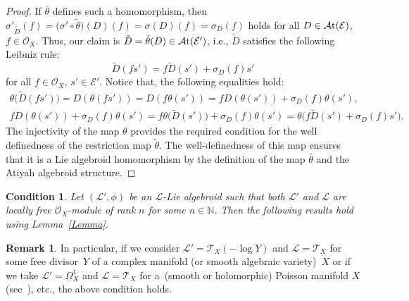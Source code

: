 \documentclass[pdftex]{sigma}
\numberwithin{equation}{section}
\newtheorem{Con}[Thm]{Condition}
\theoremstyle{definition}
\newtheorem{Rem}[Thm]{Remark}
\begin{document}
\begin{proof}
If $\bar{\theta}$ defines such a homomorphism, then $\sigma'_{\tilde{D}}(f)= \bigl(\sigma' \circ \tilde{\theta}\bigr) (D) (f)=\sigma (D)(f)=\sigma_D(f)$ holds for all $D \in \mathcal{A}{\rm t}(\mathcal{E})$, $f \in \mathcal{O}_X$. Thus, our claim is $\tilde{D}=\tilde{\theta}(D) \in \mathcal{A}{\rm t}(\mathcal{E}')$, i.e., $\tilde{D}$ satisfies the following Leibniz rule:
\[
\tilde{D}(f s')= f \tilde{D}(s')+ \sigma_D(f) s'
\]
	for all $f \in \mathcal{O}_X$, $s' \in \mathcal{E}'$.
	Notice that, the following equalities hold:
\begin{gather*}
\theta\bigl(\tilde{D}(f s')\bigr)= D(\theta (f s'))=D(f \theta(s'))= f D(\theta(s')) + \sigma_D(f) \theta(s'),\\
f D(\theta(s')) + \sigma_D(f) \theta(s')= f \theta \bigl(\tilde{D}(s')\bigr)+ \sigma_D(f) \theta(s')= \theta \bigl(f \tilde{D}(s') + \sigma_D(f) s'\bigr).
\end{gather*}
	The injectivity of the map $\theta$ provides the required condition for the well definedness of the restriction map $\tilde{\theta}$. The well-definedness of this map ensures that it is a Lie algebroid homomorphism by the definition of the map $\bar{\theta}$ and the Atiyah algebroid structure.
\end{proof}

\begin{Con} \label{locally free condition on (L', L)}
	Let $(\mathcal{L}', \phi)$ be an $\mathcal{L}$-Lie algebroid such that both $\mathcal{L}'$ and $\mathcal{L}$ are locally free $\mathcal{O}_X$\nobreakdash-module of rank $n$ for some $n \in \mathbb{N}$. Then the following results hold using Lemma~{\rm \ref{Lemma}}.
\end{Con}

 \begin{Rem}
In particular, if we consider $\mathcal{L}'= \mathcal{T}_X(-\log Y)$ and $\mathcal{L}= \mathcal{T}_X$ for some free divisor~$Y$ of a complex manifold (or smooth algebraic variety)~$X$ or if we take $\mathcal{L}'=\Omega^1_X$ and $\mathcal{L}=\mathcal{T}_X$ for a~(smooth or holomorphic) Poisson manifold $X$ (see~\cite{BP}), etc., the above condition holds.
\end{Rem}
\end{document}
